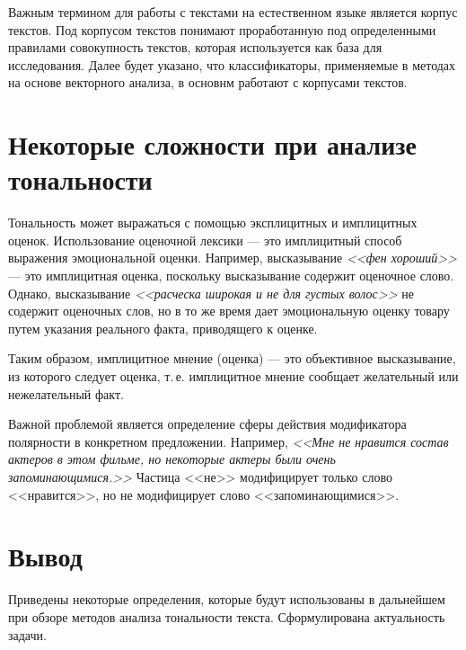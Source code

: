 Важным термином для работы с текстами на естественном языке является корпус текстов. Под корпусом текстов понимают проработанную под определенными правилами совокупность текстов, которая используется как база для исследования. Далее будет указано, что классификаторы, применяемые в методах на основе векторного анализа, в основнм работают с корпусами текстов. 

\section{Некоторые сложности при анализе \\ тональности}

Тональность может выражаться с помощью эксплицитных и имплицитных оценок. Использование оценочной лексики --- это имплицитный способ выражения эмоциональной оценки. Например, высказывание \textit{<<фен хороший>>} --- это имплицитная оценка, поскольку высказывание содержит оценочное слово. Однако, высказывание \textit{<<расческа широкая и не для густых волос>>} не содержит оценочных слов, но в то же время дает эмоциональную оценку товару путем указания реального факта, приводящего к оценке.

Таким образом, имплицитное мнение (оценка)\cite{mining} --- это объективное высказывание, из которого следует оценка, т.\,е. имплицитное мнение сообщает желательный или нежелательный факт.

Важной проблемой является определение сферы действия модификатора полярности в конкретном предложении. Например, \textit{<<Мне не нравится состав актеров в этом фильме, но некоторые актеры были очень запоминающимися.>>} Частица <<не>> модифицирует только слово <<нравится>>, но не модифицирует слово <<запоминающимися>>.
\section{Вывод}
Приведены некоторые определения, которые будут использованы в дальнейшем при обзоре методов анализа тональности текста. Сформулирована актуальность задачи.